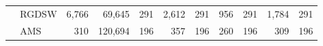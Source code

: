 \begin{table}[H]
\begin{tabular}{llrrrrrrrrr}
\cline{2-11}
\bfseries  & RGDSW & 6,766 & {\cellcolor[HTML]{E2E4FB}} \color[HTML]{000000} 69,645 & 291 & {\cellcolor[HTML]{405FE5}} \color[HTML]{F1F1F1} 2,612 & 291 & {\cellcolor[HTML]{ACB8F4}} \color[HTML]{000000} 956 & 291 & {\cellcolor[HTML]{768BEC}} \color[HTML]{F1F1F1} 1,784 & 291 \\
\cline{2-11}
\bfseries  & AMS & 310 & {\cellcolor[HTML]{E2E4FB}} \color[HTML]{000000} 120,694 & 196 & {\cellcolor[HTML]{768BEC}} \color[HTML]{F1F1F1} 357 & 196 & {\cellcolor[HTML]{ACB8F4}} \color[HTML]{000000} 260 & 196 & {\cellcolor[HTML]{405FE5}} \color[HTML]{F1F1F1} 309 & 196 \\
\cline{1-11} \cline{2-11}
\bottomrule
\end{tabular}
\end{table}
